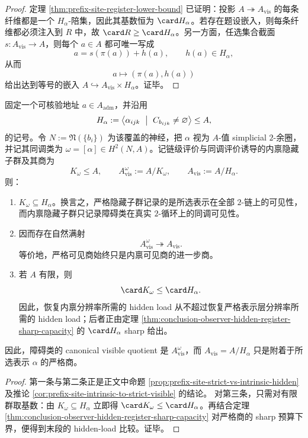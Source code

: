 \begin{proof}
定理 \ref{thm:prefix-site-register-lower-bound} 已证明：投影 \(A\twoheadrightarrow A_{\mathrm{vis}}\) 的每条纤维都是一个 \(H_\alpha\)-陪集，因此其基数恒为 \(\card H_\alpha\)。若存在题设嵌入，则每条纤维都必须注入到 \(R\) 中，故 \(\card R\ge \card H_\alpha\)。另一方面，任选集合截面 \(s:A_{\mathrm{vis}}\to A\)，则每个 \(a\in A\) 都可唯一写成
\[
a=s(\pi(a))+h(a),
\qquad
h(a)\in H_\alpha,
\]
从而
\[
a\longmapsto (\pi(a),h(a))
\]
给出达到等号的嵌入 \(A\hookrightarrow A_{\mathrm{vis}}\times H_\alpha\)。证毕。
\end{proof}

\begin{theorem}\label{thm:conclusion-observer-terminal-visible-quotient-exact-hidden-load}
固定一个可核验地址 \(a\in A_{\mathrm{adm}}\)，并沿用
\[
H_\alpha
:=
\bigl\langle \alpha_{ijk}\ \bigm|\ C_{b_{ijk}}\neq\varnothing \bigr\rangle\le A,
\]
的记号。令 \(N:=\mathfrak N(\{b_i\})\) 为该覆盖的神经，把 \(\alpha\) 视为 \(A\)-值 simplicial \(2\)-余圈，并记其同调类为 \(\omega=[\alpha]\in H^2(N,A)\)。记链级评价与同调评价诱导的内禀隐藏子群及其商为
\[
K_\omega\le A,
\qquad
A_{\mathrm{vis}}^\omega:=A/K_\omega,
\qquad
A_{\mathrm{vis}}:=A/H_\alpha.
\]
则：
\begin{enumerate}
  \item \(K_\omega\subseteq H_\alpha\)。换言之，严格隐藏子群记录的是所选表示在全部 \(2\)-链上的可见性，而内禀隐藏子群只记录障碍类在真实 \(2\)-循环上的同调可见性。
  \item 因而存在自然满射
  \[
  A_{\mathrm{vis}}^\omega\twoheadrightarrow A_{\mathrm{vis}}.
  \]
  等价地，严格可见商始终只是内禀可见商的进一步商。
  \item 若 \(A\) 有限，则
  \[
  \card K_\omega\le \card H_\alpha.
  \]
  因此，恢复内禀分辨率所需的 hidden load 从不超过恢复严格表示层分辨率所需的 hidden load；后者正由定理 \ref{thm:conclusion-observer-hidden-register-sharp-capacity} 的 \(\card H_\alpha\) sharp 给出。
\end{enumerate}
因此，障碍类的 canonical visible quotient 是 \(A_{\mathrm{vis}}^\omega\)，而 \(A_{\mathrm{vis}}=A/H_\alpha\) 只是附着于所选表示 \(\alpha\) 的严格商。
\end{theorem}
\begin{proof}
第一条与第二条正是正文中命题 \ref{prop:prefix-site-strict-vs-intrinsic-hidden} 及推论 \ref{cor:prefix-site-intrinsic-to-strict-visible} 的结论。
对第三条，只需对有限群取基数：由 \(K_\omega\subseteq H_\alpha\) 立即得 \(\card K_\omega\le \card H_\alpha\)。再结合定理 \ref{thm:conclusion-observer-hidden-register-sharp-capacity} 对严格商的 sharp 预算下界，便得到末段的 hidden-load 比较。证毕。
\end{proof}

